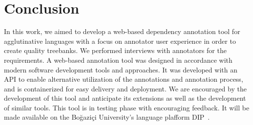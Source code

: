 \section{Conclusion}
\label{sec:conclusion}

In this work, we aimed to develop a web-based dependency annotation tool for agglutinative languages with a focus on annotator user experience in order to create quality treebanks.
We performed interviews with annotators for the requirements.
A web-based annotation tool was designed in accordance with modern software development tools and approaches.
It was developed with an API to enable alternative utilization of the annotations and annotation process, and is containerized for easy delivery and deployment.
We are encouraged by the development of this tool and anticipate its extensions as well as the development of similar tools.
This tool is in testing phase with encouraging feedback.
It will be made available on the Boğaziçi University's language plafform DIP~\cite{DIP}.
